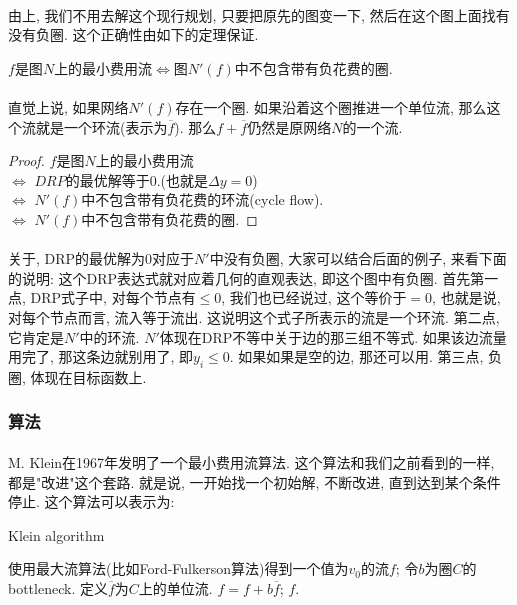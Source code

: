         \paragraph{}由上, 我们不用去解这个现行规划, 只要把原先的图变一下, 然后在这个图上面找有没有负圈. 这个正确性由如下的定理保证.
        \begin{theorem}
        $f$是图$N$上的最小费用流$\Leftrightarrow$图$N'(f)$中不包含带有负花费的圈.
        \end{theorem}
        \paragraph{}直觉上说, 如果网络$N'(f)$存在一个圈. 如果沿着这个圈推进一个单位流, 那么这个流就是一个环流(表示为$\overline{f}$). 那么$f+\overline{f}$仍然是原网络$N$的一个流.
        \begin{proof}
$f$是图$N$上的最小费用流 \\
$\Leftrightarrow$  $DRP$的最优解等于$0$.(也就是$\Delta y = 0$) \\
$\Leftrightarrow$  $N'(f)$中不包含带有负花费的环流(cycle flow).\\
$\Leftrightarrow$  $N'(f)$中不包含带有负花费的圈.
        \end{proof}
        
        \paragraph{}关于, DRP的最优解为$0$对应于$N'$中没有负圈, 大家可以结合后面的例子, 来看下面的说明: 这个DRP表达式就对应着几何的直观表达, 即这个图中有负圈. 首先第一点, DRP式子中, 对每个节点有$\leq 0$, 我们也已经说过, 这个等价于$=0$, 也就是说, 对每个节点而言, 流入等于流出. 这说明这个式子所表示的流是一个环流. 第二点, 它肯定是$N'$中的环流. $N'$体现在DRP不等中关于边的那三组不等式. 如果该边流量用完了, 那这条边就别用了, 即$y_i \leq 0$. 如果如果是空的边, 那还可以用. 第三点, 负圈, 体现在目标函数上.

        \subsubsection*{算法}
        \paragraph{}M. Klein在1967年发明了一个最小费用流算法. 这个算法和我们之前看到的一样, 都是"改进"这个套路. 就是说, 一开始找一个初始解, 不断改进, 直到达到某个条件停止. 这个算法可以表示为:
        \begin{algorithm}[h]
        \caption{Klein algorithm}
        \label{algorithm: Klein algorithm}
\begin{algorithmic}[1]
    \STATE 使用最大流算法(比如Ford-Fulkerson算法)得到一个值为$v_0$的流$f$;
    \STATE 令$b$为圈$C$的bottleneck.
    \STATE 定义$\overline{f}$为$C$上的单位流.
    \STATE $f=f+b \overline{f}$;
    \ENDWHILE
    \RETURN $f$.
\end{algorithmic}
        \end{algorithm}
